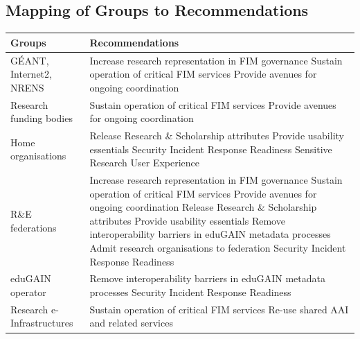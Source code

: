 \documentclass[fleqn,10pt]{wlscirep}
\begin{document}
{\subsection{Mapping of Groups to Recommendations}

\begin{center}
\begin{longtable}{|p{}|p{}|} 
\hline
Groups & Recommendations \\ \hline \hline
GÉANT, Internet2, NRENS &  
Increase research representation in FIM governance \newline
Sustain operation of critical FIM services\newline
Provide avenues for ongoing coordination \\ \hline

Research funding bodies & 
Sustain operation of critical FIM services\newline
Provide avenues for ongoing coordination \\ \hline

Home organisations & 
Release Research \& Scholarship attributes\newline
Provide usability essentials\newline
Security Incident Response Readiness\newline
Sensitive Research User Experience \\ \hline

R\&E federations & 
Increase research representation in FIM governance\newline
Sustain operation of critical FIM services\newline
Provide avenues for ongoing coordination\newline
Release Research \& Scholarship attributes\newline
Provide usability essentials\newline
Remove interoperability barriers in eduGAIN metadata processes\newline
Admit research organisations to federation\newline
Security Incident Response Readiness \\ \hline

eduGAIN operator & 
Remove interoperability barriers in eduGAIN metadata processes\newline
Security Incident Response Readiness\\ \hline

Research e-Infrastructures& 
Sustain operation of critical FIM services\newline
Re-use shared AAI and related services \\ \hline


\end{longtable}
\end{center}}
\end{document}
